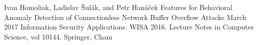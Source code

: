 
\begin{cventries}

  \cventry
    {Ivan Homoliak, Ladislav Šulák, and Petr Hanáček} %
    {Features for Behavioral Anomaly Detection of Connectionless Network Buffer Overflow Attacks} %
    {}
    {March 2017} %
    {Information Security Applications. WISA 2016. Lecture Notes in Computer Science, vol 10144. Springer, Cham} %


\end{cventries}
